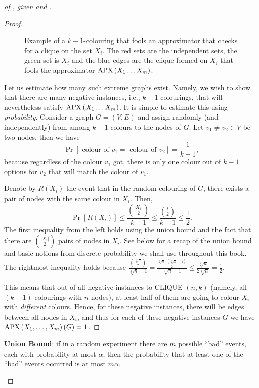 \begin{proof}[of , given   and ]
\begin{proof}
\begin{figure}[H]
    \caption{Example of a $k-1$-colouring that fools an approximator that checks for a clique on  the set $X_i$. The red sets are the independent sets, the green set is $X_i$ and the blue edges are the clique formed on $X_i$ that fools the approximator $\operatorname{\mathrm{APX}}\left(X_1 \ldots X_m\right)$.}
    \label{fig:R(xi)}
\end{figure}

Let us  estimate  how many such extreme graphs exist. 
Namely, we wish to show that there are many negative instances, i.e., $k-1$-colourings, that will nevertheless satisfy  
$\operatorname{\mathrm{APX}}\left(X_1 \ldots X_m\right)$.
It is simple to estimate this using \emph{probability}. Consider a graph $G=(V, E)$ and  assign randomly (and independently) from among $k-1$ colours to the nodes of $G$. Let $v_1 \neq v_2 \in V$ be two nodes, then we  have
$$
\operatorname{Pr}\left[\text { colour of } v_1=\text { colour of } v_2\right]=\frac{1}{k-1},
$$
because regardless of the colour $v_1$ got, there is only one colour out of $k-1$ options for $v_2$ that will match the colour of $v_1$.

Denote by $R\left(X_i\right)$ the event that in the random colouring of $G$, there exists a pair of nodes with the same colour in $X_i$.
Then, 
$$
\operatorname{Pr}\left[R\left(X_i\right)\right] \leq \frac{\binom{|X_i |}{2}}{k-1} \leq \frac{\binom{l}{2}}{k-1} \leq \frac{1}{2}.
$$
The first inequality from the left holds using the union bound and the fact that there are $\binom{\mid X_i |}{2}$ pairs
of nodes in $X_i$. See below for a recap of the union bound and basic notions from discrete probability we shall use throughout this book.
The rightmost inequality holds because 
$ \frac{\binom{\sqrt[8]{n}}{2}}{\sqrt[4]{n}-1}
= \frac{\frac{\sqrt[8]{n} \cdot(\sqrt[8]{n}-1)}{2}}{\sqrt[4]{n}-1} \le \frac{\sqrt[4]{n}}{2\sqrt[4]{n}}=\frac{1}{2}.
$



This means that out of all negative instances to CLIQUE $(n, k)$ (namely, all $(k-1)$-colourings with $n$ nodes), at least half of them are going to colour $X_i$ with \emph{different} colours. Hence, for these negative instances, there will be edges between all nodes in $X_i$, and thus for each of these negative instances $G$ we have $\mathrm{APX}\left(X_1, \ldots, X_m\right)(G)=1$.
\end{proof}




\begin{tcolorbox}[colframe=white, colback=green!4, boxrule=0mm, sharp corners]
\textbf{Union Bound}: if in a random experiment
there are $m$ possible ``bad'' events, each with probability at most $\alpha$, then the probability that at least one of the ``bad'' events occurred is at most $m\alpha$.


\end{tcolorbox}
\end{proof}
